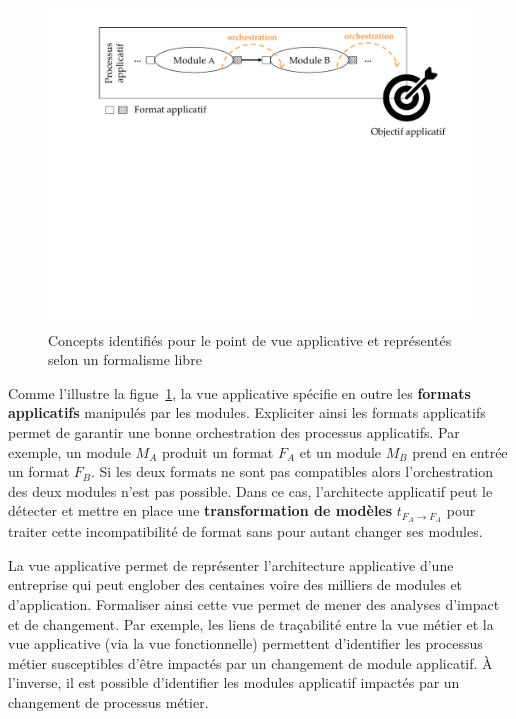     \begin{figure}[!ht]
     \begin{center}
     \includegraphics[trim= 0cm 11cm 0cm 0cm, width=1\textwidth]{figures/4_demarche/concepts_vue_applicative.pdf}
     \end{center}
     \caption{Concepts identifiés pour le point de vue applicative et représentés selon un formalisme libre}
     \label{fig:concepts_vue_applicative}
    \end{figure}

    Comme l'illustre la figue~\ref{fig:concepts_vue_applicative}, la vue applicative spécifie
    en outre les \textbf{formats applicatifs} manipulés par les modules. Expliciter
    ainsi les formats applicatifs permet de garantir une bonne orchestration des processus applicatifs. Par
    exemple, un module $M_{A}$ produit un format $F_{A}$ et
    un module $M_{B}$ prend en entrée un format $F_{B}$. Si les deux formats
    ne sont pas compatibles alors l'orchestration des deux modules n'est pas possible.
    Dans ce cas, l'architecte applicatif peut le détecter et mettre en place une \textbf{transformation de
    modèles} $t_{F_{A} \rightarrow F_{A}}$ pour traiter cette incompatibilité de format sans pour
    autant changer ses modules.

    La vue applicative permet de représenter l'architecture applicative d'une entreprise qui peut englober
    des centaines voire des milliers de modules et d'application. Formaliser ainsi cette vue permet de mener
    des analyses d'impact et de changement. Par exemple, les liens de traçabilité entre la vue métier et la
    vue applicative (via la vue fonctionnelle) permettent d'identifier les processus métier susceptibles d'être
    impactés par un changement de module applicatif. À l'inverse, il est possible d'identifier les modules
    applicatif impactés par un changement de processus métier.

